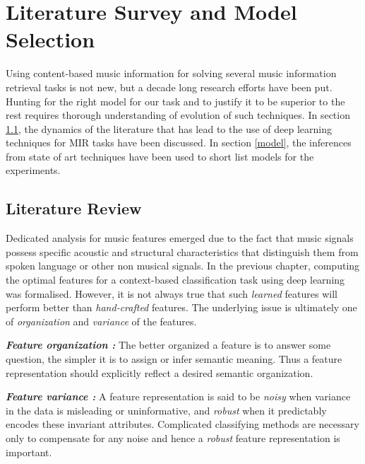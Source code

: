 


\chapter{Literature Survey and Model Selection } %

\label{Chapter3} %

Using content-based music information for solving several music information retrieval tasks is not new, but a decade long research efforts have been put. Hunting for the right model for our task and to justify it to be superior to the rest requires thorough understanding of evolution of such techniques. In section \ref{literature}, the dynamics of the literature that has lead to the use of deep learning techniques for MIR tasks have been discussed. In section \ref{model}, the inferences from state of art techniques have been used to short list models for the experiments.       


\section{Literature Review}
\label{literature}
Dedicated analysis for music features emerged due to the fact that music signals possess specific acoustic and structural characteristics that distinguish them from spoken language or other non musical signals. In the previous chapter, computing the optimal features for a context-based classification task using deep learning was formalised. However, it is not always true that such \textit{learned} features will perform better than \textit{hand-crafted} features. The underlying issue is ultimately one of \textit{organization} and \textit{variance} of the features. 
\bigskip 

\noindent \textit{\textbf{Feature organization :}} The better organized a feature is to answer some question, the simpler it is to assign or infer semantic meaning. Thus a feature representation should explicitly reflect a desired semantic organization. 

\noindent \textit{\textbf{Feature variance :}} A feature representation is said to be \textit{noisy} when variance in the data is misleading or uninformative, and \textit{robust} when it predictably encodes these invariant attributes. Complicated classifying methods are necessary only to compensate for any noise and hence a \textit{robust} feature representation is important.
\bigskip

